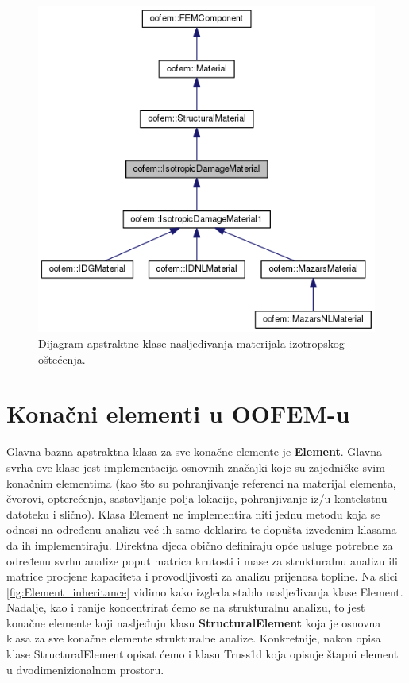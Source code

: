 \documentclass[a4paper,twoside,12pt]{memoir} %
\begin{document}
\begin{figure}[h!t]
\begin{center}
\includegraphics[scale=0.4]{pictures/chapter_oofem/IsotropicDamageMaterial_inheritance.png}
\caption{Dijagram apstraktne klase nasljeđivanja materijala izotropskog oštećenja. \cite{oofem_reference}}
\label{fig:IsotropicDamageMaterial_inheritance}
\end{center}
\end{figure}


\section{Konačni elementi u OOFEM-u}
\label{poglavlje:finite_elements_in_oofem}
Glavna bazna apstraktna klasa za sve konačne elemente je \textbf{Element}. Glavna svrha ove klase jest implementacija osnovnih značajki koje su zajedničke svim konačnim elementima (kao što su pohranjivanje referenci na materijal elementa, čvorovi, opterećenja, sastavljanje polja lokacije, pohranjivanje iz/u kontekstnu datoteku i slično). Klasa Element ne implementira niti jednu metodu koja se odnosi na određenu analizu već ih samo deklarira te dopušta izvedenim klasama da ih implementiraju. Direktna djeca obično definiraju opće usluge potrebne za određenu svrhu analize poput matrica krutosti i mase za strukturalnu analizu ili matrice procjene kapaciteta i provodljivosti za analizu prijenosa topline. Na slici \ref{fig:Element_inheritance} vidimo kako izgleda stablo nasljeđivanja klase Element. Nadalje, kao i ranije koncentrirat ćemo se na strukturalnu analizu, to jest konačne elemente koji nasljeđuju klasu \textbf{StructuralElement} koja je osnovna klasa za sve konačne elemente strukturalne analize. Konkretnije, nakon opisa klase StructuralElement opisat ćemo i klasu Truss1d koja opisuje štapni element u dvodimenizionalnom prostoru. \par
\end{document}
